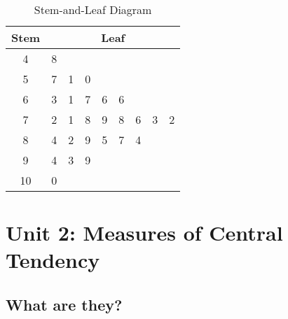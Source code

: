 \documentclass[
10pt, %
a4paper, %
]{report}
\begin{document}
\begin{table}[H]
\begin{center}
\begin{tabular}{|c|cccccccc|}
\hline
Stem &
  \multicolumn{8}{c|}{Leaf} \\ \hline
4 &
  \multicolumn{1}{c|}{8} &
  \multicolumn{1}{c|}{} &
  \multicolumn{1}{c|}{} &
  \multicolumn{1}{c|}{} &
  \multicolumn{1}{c|}{} &
  \multicolumn{1}{c|}{} &
  \multicolumn{1}{c|}{} &
   \\ \hline
5 &
  \multicolumn{1}{c|}{7} &
  \multicolumn{1}{c|}{1} &
  \multicolumn{1}{c|}{0} &
  \multicolumn{1}{c|}{} &
  \multicolumn{1}{c|}{} &
  \multicolumn{1}{c|}{} &
  \multicolumn{1}{c|}{} &
   \\ \hline
6 &
  \multicolumn{1}{c|}{3} &
  \multicolumn{1}{c|}{1} &
  \multicolumn{1}{c|}{7} &
  \multicolumn{1}{c|}{6} &
  \multicolumn{1}{c|}{6} &
  \multicolumn{1}{c|}{} &
  \multicolumn{1}{c|}{} &
   \\ \hline
7 &
  \multicolumn{1}{c|}{2} &
  \multicolumn{1}{c|}{1} &
  \multicolumn{1}{c|}{8} &
  \multicolumn{1}{c|}{9} &
  \multicolumn{1}{c|}{8} &
  \multicolumn{1}{c|}{6} &
  \multicolumn{1}{c|}{3} &
  2 \\ \hline
8 &
  \multicolumn{1}{c|}{4} &
  \multicolumn{1}{c|}{2} &
  \multicolumn{1}{c|}{9} &
  \multicolumn{1}{c|}{5} &
  \multicolumn{1}{c|}{7} &
  \multicolumn{1}{c|}{4} &
  \multicolumn{1}{c|}{} &
   \\ \hline
9 &
  \multicolumn{1}{c|}{4} &
  \multicolumn{1}{c|}{3} &
  \multicolumn{1}{c|}{9} &
  \multicolumn{1}{c|}{} &
  \multicolumn{1}{c|}{} &
  \multicolumn{1}{c|}{} &
  \multicolumn{1}{c|}{} &
   \\ \hline
10 &
  \multicolumn{1}{c|}{0} &
  \multicolumn{1}{c|}{} &
  \multicolumn{1}{c|}{} &
  \multicolumn{1}{c|}{} &
  \multicolumn{1}{c|}{} &
  \multicolumn{1}{c|}{} &
  \multicolumn{1}{c|}{} &
   \\ \hline
\end{tabular}
\end{center}
\caption{Stem-and-Leaf Diagram}
\label{fig:stemleaf}
\end{table}






\chapter{Unit 2: Measures of Central Tendency}
\section{What are they?}
\end{document}

